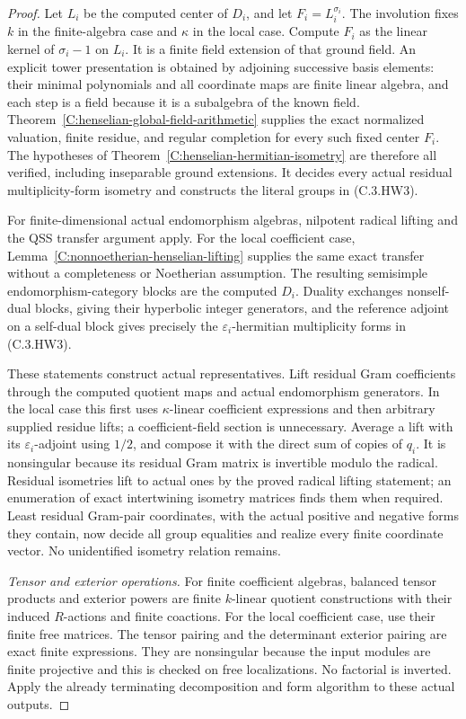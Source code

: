 \begin{proof}
Let $L_i$ be the computed
center of $D_i$, and let
$F_i=L_i^{\sigma_i}$.
The involution fixes $k$ in
the finite-algebra case and
$\kappa$ in the local case.
Compute $F_i$ as the linear
kernel of $\sigma_i-1$ on
$L_i$.  It is a finite field
extension of that ground field.
An explicit tower presentation
is obtained by adjoining
successive basis elements:
their minimal polynomials and
all coordinate maps are finite
linear algebra, and each step
is a field because it is a
subalgebra of the known field.
Theorem~\ref{C:henselian-global-field-arithmetic}
supplies the exact normalized
valuation, finite residue,
and regular completion for
every such fixed center $F_i$.
The hypotheses of
Theorem~\ref{C:henselian-hermitian-isometry}
are therefore all verified,
including inseparable ground
extensions.  It decides every
actual residual multiplicity-form
isometry and constructs the
literal groups in (C.3.HW3).

For finite-dimensional actual
endomorphism algebras, nilpotent
radical lifting and the QSS
transfer argument apply.
For the local coefficient case,
Lemma~\ref{C:nonnoetherian-henselian-lifting}
supplies the same exact transfer
without a completeness or
Noetherian assumption.
The resulting semisimple
endomorphism-category blocks
are the computed $D_i$.
Duality exchanges nonself-dual
blocks, giving their hyperbolic
integer generators, and the
reference adjoint on a self-dual
block gives precisely the
$\varepsilon_i$-hermitian
multiplicity forms in (C.3.HW3).

These statements construct
actual representatives.
Lift residual Gram coefficients
through the computed quotient
maps and actual endomorphism
generators.  In the local case
this first uses $\kappa$-linear
coefficient expressions and
then arbitrary supplied residue
lifts; a coefficient-field
section is unnecessary.
Average a lift with its
$\varepsilon_i$-adjoint using
$1/2$, and compose it with
the direct sum of copies of
$q_i$.
It is nonsingular because
its residual Gram matrix is
invertible modulo the radical.
Residual isometries lift to
actual ones by the proved
radical lifting statement;
an enumeration of exact
intertwining isometry matrices
finds them when required.
Least residual Gram-pair
coordinates, with the actual
positive and negative forms
they contain, now decide
all group equalities and
realize every finite coordinate
vector.  No unidentified
isometry relation remains.

\emph{Tensor and exterior operations.}
For finite coefficient algebras,
balanced tensor products and
exterior powers are finite
$k$-linear quotient constructions
with their induced $R$-actions
and finite coactions.
For the local coefficient case,
use their finite free matrices.
The tensor pairing and the
determinant exterior pairing
are exact finite expressions.
They are nonsingular because
the input modules are finite
projective and this is checked
on free localizations.
No factorial is inverted.
Apply the already terminating
decomposition and form algorithm
to these actual outputs.


\end{proof}
